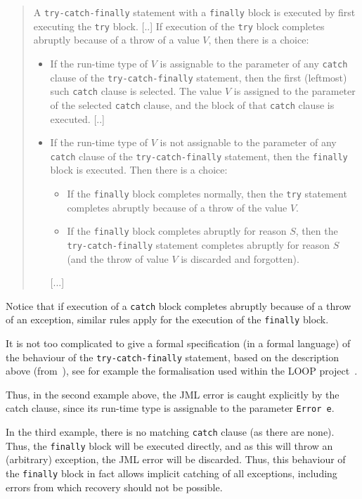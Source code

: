 \documentclass[]{llncs}
\begin{document}
\begin{quotation}
A \texttt{try-catch-finally} statement with a \texttt{finally} block
is executed by first executing the \texttt{try} block. [..]  If
execution of the \texttt{try} block completes abruptly because of a
throw of a value \(V\), then there is a choice:
\begin{itemize}
\item If the run-time type of \(V\) is assignable to the parameter of
any \texttt{catch} clause of the \texttt{try-catch-finally} statement,
then the first (leftmost) such \texttt{catch} clause is selected. The
value \(V\) is assigned to the parameter of the selected
\texttt{catch} clause, and the block of that \texttt{catch} clause is
executed. [..]

\item If the run-time type of \(V\) is not assignable to the parameter
of any \texttt{catch} clause of the \texttt{try-catch-finally}
statement, then the \texttt{finally} block is executed. Then there is
a choice:

\begin{itemize}
\item If the \texttt{finally} block completes normally, then the \texttt{try}
statement completes abruptly because of a throw of the value \(V\).
\item If the \texttt{finally} block completes abruptly for reason
\(S\), then the \texttt{try-catch-finally} statement completes
abruptly for reason \(S\) (and the throw of value \(V\) is discarded
and forgotten).
\end{itemize} 
[...]
\end{itemize}
\end{quotation}

Notice that if execution of a \texttt{catch} block completes abruptly
because of a throw of an exception, similar rules apply for the
execution of the \texttt{finally} block.


It is not too complicated to give a formal specification (in a formal
language) of the behaviour of the \texttt{try-catch-finally}
statement, based on the description above (from~\cite{GoslingJSB05}),
see for example the formalisation used within the LOOP
project~\cite{Jacobs01}.

Thus, in the second example above, the JML error is caught explicitly
by the catch clause, since its run-time type is assignable to the
parameter \texttt{Error e}.

In the third example, there is no matching \texttt{catch} clause (as
there are none). Thus, the \texttt{finally} block will be executed
directly, and as this will throw an (arbitrary) exception, the JML
error will be discarded. Thus, this behaviour of the \texttt{finally}
block in fact allows implicit catching of all exceptions, including
errors from which recovery should not be possible.
\end{document}
